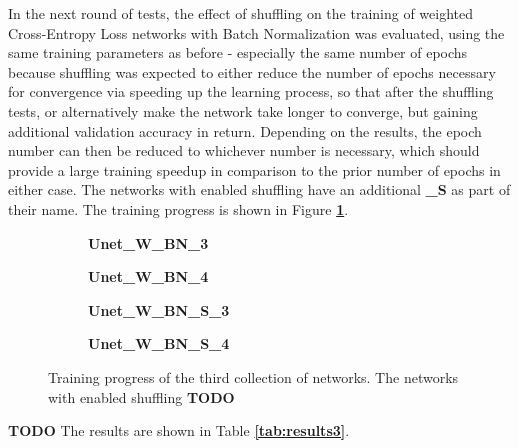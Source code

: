 In the next round of tests, the effect of shuffling on the training of weighted Cross-Entropy Loss networks with Batch Normalization was evaluated, using the same training parameters as before - especially the same number of epochs because shuffling was expected to either reduce the number of epochs necessary for convergence via speeding up the learning process, so that after the shuffling tests, or alternatively make the network take longer to converge, but gaining additional validation accuracy in return. Depending on the results, the epoch number can then be reduced to whichever number is necessary, which should provide a large training speedup in comparison to the prior number of epochs in either case. The networks with enabled shuffling have an additional \textbf{\_S} as part of their name. The training progress is shown in Figure \textbf{\ref{fig:weighted_batchnorm_shuffle_training}}.

\begin {figure}[!ht]
	\begin {subfigure}[b]{0.4\linewidth}
		\scalebox{0.65}{}
		\caption{\textbf{Unet\_W\_BN\_3}}
	\end {subfigure}\hspace{1.75cm}
	\begin {subfigure}[b]{0.4\linewidth}
		\scalebox{0.65}{}
		\caption{\textbf{Unet\_W\_BN\_4}}
	\end {subfigure}

	\begin {subfigure}[b]{0.4\linewidth}
		\caption{\textbf{Unet\_W\_BN\_S\_3}}
	\end {subfigure}\hspace{1.75cm}
	\begin {subfigure}[b]{0.4\linewidth}
		\caption{\textbf{Unet\_W\_BN\_S\_4}}
	\end {subfigure}

		\caption[Training progress of the third collection of networks.]{Training progress of the third collection of networks. The networks with enabled shuffling \textbf{TODO}}
		\label{fig:weighted_batchnorm_shuffle_training}
\end {figure}


\textbf{TODO} The results are shown in Table \textbf{\ref{tab:results3}}. \\


